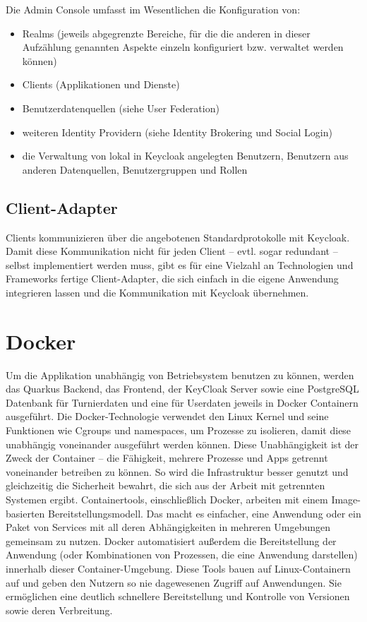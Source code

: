 Die Admin Console umfasst im Wesentlichen die Konfiguration von:
\begin{itemize}
    \item Realms (jeweils abgegrenzte Bereiche, für die die anderen in dieser Aufzählung genannten Aspekte einzeln konfiguriert bzw. verwaltet werden können)
    \item Clients (Applikationen und Dienste)
    \item Benutzerdatenquellen (siehe User Federation)
    \item weiteren Identity Providern (siehe Identity Brokering und Social Login)
    \item die Verwaltung von lokal in Keycloak angelegten Benutzern, Benutzern aus anderen Datenquellen, Benutzergruppen und Rollen
\end{itemize}
\cite{sysarch-keycloak-2}

\subsection{Client-Adapter}

Clients kommunizieren über die angebotenen Standardprotokolle mit Keycloak. Damit diese Kommunikation nicht für jeden Client – evtl. sogar redundant – selbst implementiert werden muss, 
gibt es für eine Vielzahl an Technologien und Frameworks fertige Client-Adapter, die sich einfach in die eigene Anwendung integrieren lassen und die Kommunikation mit Keycloak übernehmen. 
\cite{sysarch-keycloak-2}

\section{Docker}

Um die Applikation unabhängig von Betriebsystem benutzen zu können, werden das Quarkus Backend, das Frontend, der KeyCloak Server sowie 
eine PostgreSQL Datenbank für Turnierdaten und eine für Userdaten jeweils in Docker Containern ausgeführt.
Die Docker-Technologie verwendet den Linux Kernel und seine Funktionen wie Cgroups und namespaces, um Prozesse zu isolieren, damit diese unabhängig voneinander ausgeführt werden können. 
Diese Unabhängigkeit ist der Zweck der Container – die Fähigkeit, mehrere Prozesse und Apps getrennt voneinander betreiben zu können. 
So wird die Infrastruktur besser genutzt und gleichzeitig die Sicherheit bewahrt, die sich aus der Arbeit mit getrennten Systemen ergibt.
Containertools, einschließlich Docker, arbeiten mit einem Image-basierten Bereitstellungsmodell. Das macht es einfacher, eine Anwendung oder ein Paket von Services mit all deren 
Abhängigkeiten in mehreren Umgebungen gemeinsam zu nutzen. Docker automatisiert außerdem die Bereitstellung der Anwendung 
(oder Kombinationen von Prozessen, die eine Anwendung darstellen) innerhalb dieser Container-Umgebung. Diese Tools bauen auf Linux-Containern auf 
und geben den Nutzern so nie dagewesenen Zugriff auf Anwendungen. Sie ermöglichen eine deutlich schnellere Bereitstellung und Kontrolle von Versionen sowie deren Verbreitung.
\cite{sysarch-docker-1}

